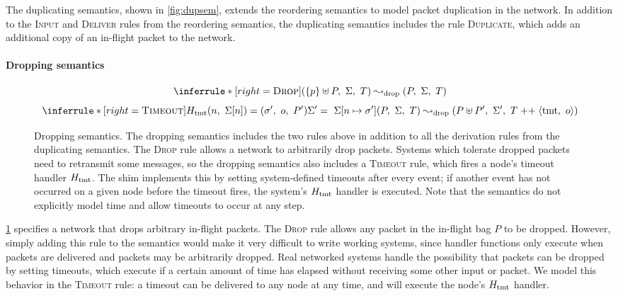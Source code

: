 The duplicating semantics, shown in \cref{fig:dupsem}, extends the
reordering semantics to model packet duplication in the network.
%
In addition to the \textsc{Input} and \textsc{Deliver} rules from the
reordering semantics, the duplicating semantics includes the rule
\textsc{Duplicate}, which adds an additional copy of an in-flight packet to
the network.

\paragraph{Dropping semantics}

\begin{figure}[t]
  \centering

  \begin{footnotesize} \begin{spacing}{1.5} \[
    \inferrule*[right=\textsc{Drop}]{
    }{
      (\{p\} \uplus P,\ \Sigma,\ T) \fdropstep (P,\ \Sigma,\ T)
    }
  \]\[
    \inferrule*[right=\textsc{Timeout}]{
      \fHtmt(n,\ \Sigma[n]) = (\sigma',\ o,\ P') \\
      \Sigma' =\ \Sigma[n \mapsto \sigma'] \\
    }{
      (P,\ \Sigma,\ T) \fdropstep (P \uplus P',\ \Sigma',\ T \appop \traceelt{\mathrm{tmt},\ o})
    }
  \] \end{spacing} \end{footnotesize}

  \caption{Dropping semantics.
    The dropping semantics includes the two rules above in addition to all
    the derivation rules from the duplicating semantics.  The \textsc{Drop}
    rule allows a network to arbitrarily drop packets.  Systems which
    tolerate dropped packets need to retransmit some messages, so the
    dropping semantics also includes a \textsc{Timeout} rule, which fires a
    node's timeout handler $H_{\mathrm{tmt}}$.  The \Verdi shim implements this by
    setting system-defined timeouts after every event; if another event has
  not occurred on a given node before the timeout fires, the system's
$H_{\mathrm{tmt}}$ handler is executed. Note that the semantics do not explicitly
model time and allow timeouts to occur at any step.}

\label{fig:dropsem}
\end{figure}

\cref{fig:dropsem} specifies a network that drops arbitrary in-flight
packets.
%
The \textsc{Drop} rule allows any packet in the in-flight bag $P$ to be
dropped.
%
However, simply adding this rule to the semantics would make it very
difficult to write working systems, since handler functions only execute
when packets are delivered and packets may be arbitrarily dropped.
%
Real networked systems handle the possibility that packets can be dropped
by setting timeouts, which execute if a certain amount of time has elapsed
without receiving some other input or packet.
%
We model this behavior in the \textsc{Timeout} rule: a timeout can be
delivered to any node at any time, and will execute the node's $H_{\mathrm{tmt}}$
handler.


